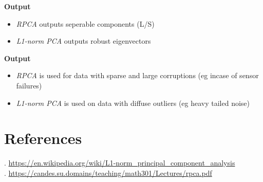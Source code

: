 \documentclass{article}
\begin{document}
\noindent \textbf{Output}
\begin{itemize}
    \item \textit{RPCA} outputs seperable components (L/S)
    \item \textit{L1-norm PCA} outputs robust eigenvectors
\end{itemize}

\noindent \textbf{Output}
\begin{itemize}
    \item \textit{RPCA} is used for data with sparse and large corruptions (eg incase of sensor failures)
    \item \textit{L1-norm PCA} is used on data with diffuse outliers (eg heavy tailed noise)
\end{itemize}




\section*{References}
. \url{https://en.wikipedia.org/wiki/L1-norm_principal_component_analysis}\\
. \url{https://candes.su.domains/teaching/math301/Lectures/rpca.pdf}
\end{document}
